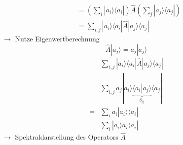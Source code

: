 \documentclass[10pt,article,colorback,accentcolor=tud9d]{scrartcl}
\begin{document}
\begin{fleqn}
\begin{itemize}
\begin{equation}
\begin{aligned}
    &=\left(\sum_i\left.\right|a_i\rangle \langle a_i\left.\right|\right)\hat{A}\left(\sum_j\left.\right|a_j\rangle \langle a_j\left.\right|\right)\\
    &=\sum_{i,j}\left.\right|a_i\rangle \langle a_i\left.\right|\hat{A}\left.\right|a_j\rangle \langle a_j\left.\right|
    \end{aligned}
    \end{equation}
    $\rightarrow$ Nutze Eigenwertberechnung
    \begin{equation}
    \hat{A}\left.\right|a_j\rangle =a_j\left.\right|a_j\rangle  \nonumber
    \end{equation}
    \begin{equation}
    \begin{aligned}
    &\sum_{i,j}\left.\right|a_i\rangle \langle a_i\left.\right|\hat{A}\left.\right|a_j\rangle \langle a_j\left.\right|\\
    =&\sum_{i,j}a_j\left.\right|a_i\rangle \underbrace{\langle a_i\left.\right|a_j\rangle }_{\delta_{ij}}\langle a_j\left.\right|\\
    =&\sum_ia_i\left.\right|a_i\rangle \langle a_i\left.\right|\\
    =&\sum_i\left.\right|a_i\rangle a_i\langle a_i\left.\right|
    \end{aligned}
    \end{equation}
    $\rightarrow$ Spektraldarstellung des Operators $\hat{A}$
  
\end{itemize}


\end{fleqn}
\end{document}
